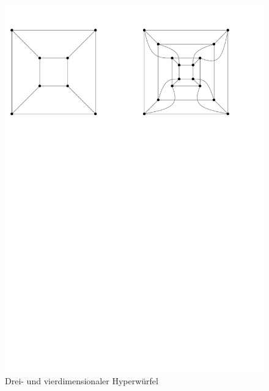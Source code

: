 \begin{figure}[h!]
\centering
\includegraphics[scale=0.6]{bilder/Hyperwuerfel.pdf}
\caption{Drei- und vierdimensionaler Hyperwürfel}
\end{figure}

